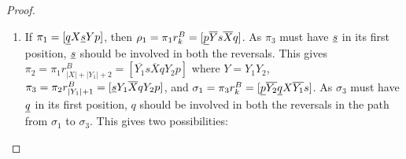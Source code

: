 \documentclass[final]{dmtcs-episciences}
\numberwithin{equation}{section}
\begin{document}
\begin{proof}
\begin{enumerate}
\begin{enumerate}
    \begin{enumerate}
        \item $\sigma_{2}=\sigma_{1}r^B_{|Y_2|+1}[Y_2 p \overline{Y_1} \ \overline{X_1} q X_2 s ]$ where $Y=Y_1Y_2$ and $\sigma_{3}=\sigma_{2}r^B_{|Y|+|X_1|+2} = [\uline{q} X_1 Y_1 \uline{p}$ $\overline{Y_2}X_2 s]$. Following through with this possibility we get $\rho_{3}=[\uline{s} \overline{X_2} Y_2 p \overline{Y_1}\ \overline{X_1} q]$. We need a path of length two from $\rho_{3}$ to $\rho_{1}=[\uline{p} \overline{Y_2}\ \overline{Y_1} \uline{s} \overline{X_2}\ \overline{X_1} q]$. As $\rho_{1}$ has $\uline{p}$ in its first position, $p$ should be involved in only the second reversal. In order for this to be so, without having to exchange the positions of $Y_1$, it must be that $|Y_1|=0$. %
        Then we get $\rho_{3}r^B_{|X_2|+1}r^B_{|X_2|+|Y_2|+2}=\rho_{1}$. Taking $|X|=i-1$ and $|X_2|=j-1$ we get $|Y_2|=k-i-j-1 \geq 0$ and a cycle corresponding to (\ref{9-2}).
        
        \item $\sigma_{2}=\sigma_{1}r^B_{|Y|+|X_{12}|+1}=[X_{12} Y p \overline{X_{11}} q X_2 s]$ where $X_1=X_{11}X_{12}$ with $|X_{12}|\geq 1$ and $\sigma_{3}=\sigma_{2}r^B_{|Y|+|X_1|+2} = [\uline{q} X_{11} \uline{p} \overline{Y} p \overline{X_{12}} X_2 s]$. Following through with this possibility we get $\rho_{3}=[\uline{s} \overline{X_2} X_{12} Y p  \overline{X_{11}} q]$. We need a path of length two from $\rho_{3}$ to $\rho_{1}=[\uline{p} \overline{Y}\ \uline{s} \overline{X_2} \ \overline{X_{12}}\ \overline{X_{11}}q]$. As $\rho_{1}$ has $\uline{p}$ in its first position, $p$ should be involved in only the second reversal. We have $\rho_{3}r^B_{|X_2|+|X_{12}|+1}r^B_{|X_{12}}|r^B_{|X_2|+|X_{12}|+|Y|+2}=\rho_{1}$. This is a path of length three which can be reduced to length two if and only if $|X_{12}|=0$. Since $|X_{12}| \geq 1$ this possibility does not give any 9-cycle.
    \end{enumerate}
    
    \item If $\pi_{1} = [\uline{q} X \uline{s} Y p]$, then $\rho_{1}=\pi_{1}r^B_k=[\uline{p} \overline{Y} s \overline{X} q]$. As $\pi_{3}$ must have $\uline{s}$ in its first position, $\uline{s}$ should be involved in both the reversals. This gives $\pi_{2}=\pi_{1}r^B_{|X|+|Y_1|+2}=[\overline{Y_1} s \overline{X} q Y_2 p]$ where $Y=Y_1 Y_2$, $\pi_{3}=\pi_{2}r^B_{|Y_1|+1}=[\uline{s} Y_1 \overline{X} q Y_2 p]$, and $\sigma_{1}=\pi_{3}r^B_k=[\uline{p} \overline{Y_2} \uline{q} X \overline{Y_1} s]$. As $\sigma_{3}$ must have $\uline{q}$ in its first position, $q$ should be involved in both the reversals in the path from $\sigma_{1}$ to $\sigma_{3}$. This gives two possibilities:
    

\end{enumerate}
\end{enumerate}
\end{proof}
\end{document}
